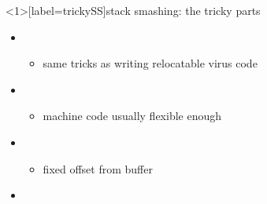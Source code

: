
\begin{frame}<1>[label=trickySS]{stack smashing: the tricky parts}
    \begin{itemize}
    \item {}
        \begin{itemize}
        \item same tricks as writing relocatable virus code
        \end{itemize}
    \item {}
        \begin{itemize}
        \item machine code usually flexible enough
        \end{itemize}
    \item {}
        \begin{itemize}
        \item fixed offset from buffer
        \end{itemize}
    \item {}
    \end{itemize}
\end{frame}

